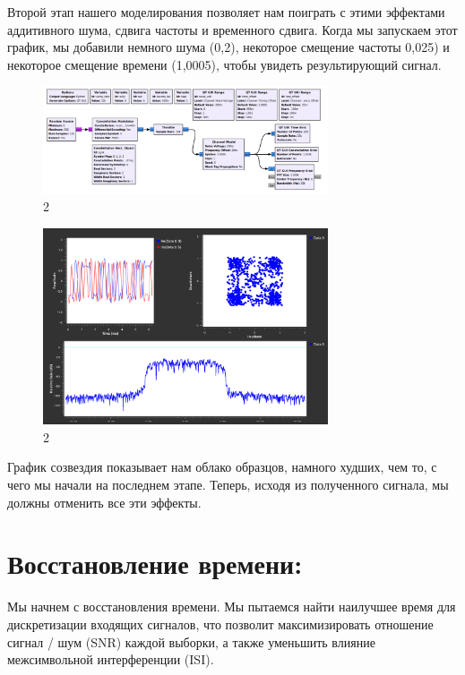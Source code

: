 \documentclass[10pt,a4paper,oneside]{article}
\begin{document}
Второй этап нашего моделирования позволяет нам поиграть с этими эффектами аддитивного шума, сдвига частоты и временного сдвига. Когда мы запускаем этот график, мы добавили немного шума (0,2), некоторое смещение частоты 0,025) и некоторое смещение времени (1,0005), чтобы увидеть результирующий сигнал.

\begin{figure}[H]
        \centering
        \includegraphics[width=0.75\textwidth]{pics/4.png}
        \caption{2}
        \label{fig:first}
\end{figure}

\begin{figure}[H]
        \centering
        \includegraphics[width=0.75\textwidth]{pics/5.png}
        \caption{2}
        \label{fig:first}
\end{figure}

График созвездия показывает нам облако образцов, намного худших, чем то, с чего мы начали на последнем этапе. Теперь, исходя из полученного сигнала, мы должны отменить все эти эффекты.

\section{Восстановление времени:}

Мы начнем с восстановления времени. Мы пытаемся найти наилучшее время для дискретизации входящих сигналов, что позволит максимизировать отношение сигнал / шум (SNR) каждой выборки, а также уменьшить влияние межсимвольной интерференции (ISI).
\end{document}
